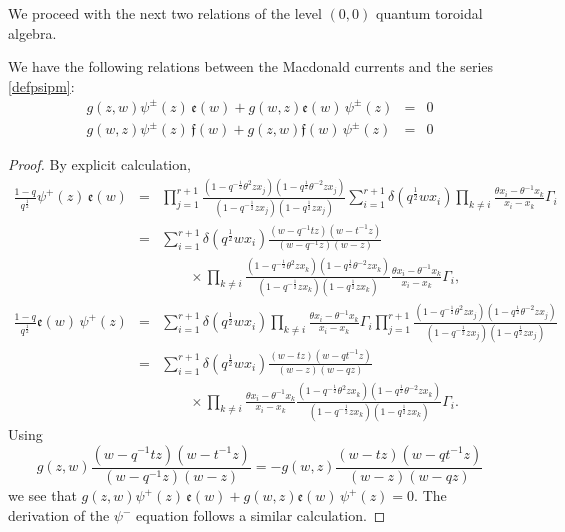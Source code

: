 We proceed with the next two relations of the level $(0,0)$ quantum toroidal algebra.

\begin{thm}\label{commuefpsi}
We have the following relations between the Macdonald currents and the series \eqref{defpsipm}:
\begin{eqnarray*}
g(z,w)\psi^\pm(z)\,{\mathfrak e}(w)+g(w,z){\mathfrak e}(w)\,\psi^\pm(z)&=&0\\
g(w,z)\psi^\pm(z)\,{\mathfrak f}(w)+g(z,w){\mathfrak f}(w)\,\psi^\pm(z)&=&0
\end{eqnarray*}
\end{thm}
\begin{proof} By explicit calculation,
\begin{eqnarray*}
\frac{1-q}{q^{\frac{1}{2}}}\psi^+(z)\,{\mathfrak e}(w)&=&
\prod_{j=1}^{r+1} 
\frac{(1-q^{-\frac{1}{2}}\theta^2 z x_j)(1-q^{\frac{1}{2}}\theta^{-2} z x_j)}{(1-q^{-\frac{1}{2}} z x_j)(1-q^{\frac{1}{2}} z x_j)} 
\sum_{i=1}^{r+1} \delta(q^{\frac{1}{2}}w x_i)\prod_{k\neq i}\frac{\theta x_i-\theta^{-1}x_k}{x_i-x_k}\Gamma_i \\
&=&\sum_{i=1}^{r+1} \delta(q^{\frac{1}{2}}w x_i)\frac{(w-q^{-1}t z)(w-t^{-1} z)}{(w-q^{-1} z)(w-z)}\\
&&\qquad \times
\prod_{k\neq i}\frac{(1-q^{-\frac{1}{2}}\theta^2 z x_k)(1-q^{\frac{1}{2}}\theta^{-2} z x_k)}{(1-q^{-\frac{1}{2}} z x_k)(1-q^{\frac{1}{2}} z x_k)}\frac{\theta x_i-\theta^{-1}x_k}{x_i-x_k}\Gamma_i ,
\end{eqnarray*}
\begin{eqnarray*}
\frac{1-q}{q^{\frac{1}{2}}}{\mathfrak e}(w)\,\psi^+(z)&=&
\sum_{i=1}^{r+1} \delta(q^{\frac{1}{2}}w x_i)\prod_{k\neq i}\frac{\theta x_i-\theta^{-1}x_k}{x_i-x_k}\Gamma_i \prod_{j=1}^{r+1} 
\frac{(1-q^{-\frac{1}{2}}\theta^2 z x_j)(1-q^{\frac{1}{2}}\theta^{-2} z x_j)}{(1-q^{-\frac{1}{2}} z x_j)(1-q^{\frac{1}{2}} z x_j)}  \\
&=&\sum_{i=1}^{r+1} \delta(q^{\frac{1}{2}}w x_i)
\frac{(w-t z)(w-q t^{-1} z)}{(w- z)(w-q z)}\\
&&\qquad \times
\prod_{k\neq i}\frac{\theta x_i-\theta^{-1}x_k}{x_i-x_k}
\frac{(1-q^{-\frac{1}{2}}\theta^2 z x_k)(1-q^{\frac{1}{2}}\theta^{-2} z x_k)}{(1-q^{-\frac{1}{2}} z x_k)(1-q^{\frac{1}{2}} z x_k)}\Gamma_i .
\end{eqnarray*}
Using
$$ g(z,w)\frac{(w-q^{-1}t z)(w-t^{-1} z)}{(w-q^{-1} z)(w-z)}=-g(w,z)\frac{(w-t z)(w-q t^{-1} z)}{(w- z)(w-q z)}$$
we see that $g(z,w)\psi^+(z)\,{\mathfrak e}(w)+g(w,z){\mathfrak e}(w)\,\psi^+(z)=0$. The derivation of the $\psi^-$
equation follows a similar calculation.
\end{proof}

